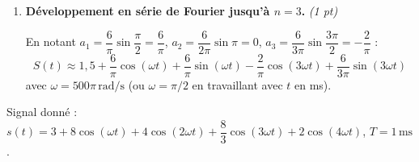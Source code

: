 \documentclass[a4paper,11pt]{article}
\newcommand{\dt}{\mathrm{d}t}
\newcommand{\reponse}[1]{\begin{tcolorbox}[reponsebox]#1\end{tcolorbox}}
\begin{document}
\begin{enumerate}[label=\textbf{\arabic*.}, itemsep=0.4cm]
  \reponse{
  \[
    b_n = \frac{2}{T}\int_0^{T} u(t)\sin(n\omega t)\,\dt
    = \frac{2}{4}\int_0^{1} 6\sin(n\omega t)\,\dt
    = 3\left[-\frac{\cos(n\omega t)}{n\omega}\right]_0^1
    = \frac{3}{n\omega}\bigl(1 - \cos(n\omega)\bigr)
  \]
  \[
    \boxed{b_n = \frac{6}{n\pi}\left(1 - \cos\!\left(\frac{n\pi}{2}\right)\right)}
  \]
  \textbf{Valeurs numériques :}
  \begin{align*}
    b_1 &= \frac{6}{\pi}\left(1 - \cos\frac{\pi}{2}\right) = \frac{6}{\pi}(1-0) = \frac{6}{\pi} \approx \mathbf{1{,}91\,\mathrm{V}}\\[4pt]
    b_2 &= \frac{6}{2\pi}\left(1 - \cos\pi\right) = \frac{6}{2\pi}(1-(-1)) = \frac{12}{2\pi} = \frac{6}{\pi} \approx \mathbf{1{,}91\,\mathrm{V}}\\[4pt]
    b_3 &= \frac{6}{3\pi}\left(1 - \cos\frac{3\pi}{2}\right) = \frac{2}{\pi}(1-0) = \frac{2}{\pi} \approx \mathbf{0{,}64\,\mathrm{V}}
  \end{align*}
  }

  \item \textbf{Développement en série de Fourier jusqu'à $n=3$.} \hfill\textit{(1 pt)}

  \reponse{
  En notant $a_1 = \dfrac{6}{\pi}\sin\!\dfrac{\pi}{2} = \dfrac{6}{\pi}$,\; $a_2 = \dfrac{6}{2\pi}\sin\pi = 0$,\; $a_3 = \dfrac{6}{3\pi}\sin\!\dfrac{3\pi}{2} = -\dfrac{2}{\pi}$ :
  \[
    S(t) \approx 1{,}5 + \frac{6}{\pi}\cos(\omega t) + \frac{6}{\pi}\sin(\omega t)
    - \frac{2}{\pi}\cos(3\omega t) + \frac{6}{3\pi}\sin(3\omega t)
  \]
  avec $\omega = 500\pi\,\mathrm{rad/s}$ (ou $\omega = \pi/2$ en travaillant avec $t$ en ms).
  }

\end{enumerate}

\newpage

\begin{tcolorbox}[exobox={Exercice 3 \hfill \normalfont\textit{(10 points)}}]
Signal donné : $s(t) = 3 + 8\cos(\omega t) + 4\cos(2\omega t) + \dfrac{8}{3}\cos(3\omega t) + 2\cos(4\omega t)$, \; $T = 1\,\mathrm{ms}$.
\end{tcolorbox}
\end{document}
